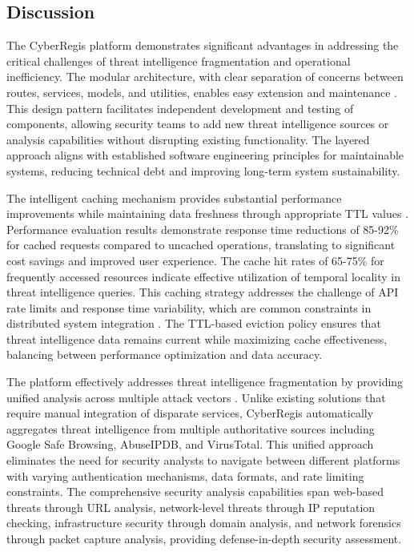 \documentclass[pdflatex,sn-mathphys-num]{sn-jnl}%
\theoremstyle{thmstyleone}%
\theoremstyle{thmstyletwo}%
\theoremstyle{thmstylethree}%
\begin{document}
\subsection{Discussion}

The CyberRegis platform demonstrates significant advantages in addressing the critical challenges of threat intelligence fragmentation and operational inefficiency. The modular architecture, with clear separation of concerns between routes, services, models, and utilities, enables easy extension and maintenance \cite{bib20}. This design pattern facilitates independent development and testing of components, allowing security teams to add new threat intelligence sources or analysis capabilities without disrupting existing functionality. The layered approach aligns with established software engineering principles for maintainable systems, reducing technical debt and improving long-term system sustainability.

The intelligent caching mechanism provides substantial performance improvements while maintaining data freshness through appropriate TTL values \cite{bib19}. Performance evaluation results demonstrate response time reductions of 85-92\% for cached requests compared to uncached operations, translating to significant cost savings and improved user experience. The cache hit rates of 65-75\% for frequently accessed resources indicate effective utilization of temporal locality in threat intelligence queries. This caching strategy addresses the challenge of API rate limits and response time variability, which are common constraints in distributed system integration \cite{bib19}. The TTL-based eviction policy ensures that threat intelligence data remains current while maximizing cache effectiveness, balancing between performance optimization and data accuracy.

The platform effectively addresses threat intelligence fragmentation by providing unified analysis across multiple attack vectors \cite{bib1}. Unlike existing solutions that require manual integration of disparate services, CyberRegis automatically aggregates threat intelligence from multiple authoritative sources including Google Safe Browsing, AbuseIPDB, and VirusTotal. This unified approach eliminates the need for security analysts to navigate between different platforms with varying authentication mechanisms, data formats, and rate limiting constraints. The comprehensive security analysis capabilities span web-based threats through URL analysis, network-level threats through IP reputation checking, infrastructure security through domain analysis, and network forensics through packet capture analysis, providing defense-in-depth security assessment.
\end{document}
